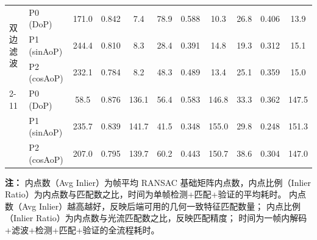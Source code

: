 \begin{table}[t]
\begin{tabular}{llccccccccc}
\multirow{3}{*}{双边滤波}
    & P0 (DoP)     & 171.0 & 0.842 & 7.4  & 78.9  & 0.588 & 10.3 & 26.8  & 0.406 & 13.9 \\
    & P1 (sinAoP)  & 244.4 & 0.810 & 8.3  & 28.4  & 0.391 & 14.8 & 19.3  & 0.312 & 15.1 \\
    & P2 (cosAoP)  & 232.1 & 0.784 & 8.2  & 48.3  & 0.489 & 13.4 & 25.1  & 0.359 & 15.0 \\
\cmidrule{2-11}

\multirow{3}{*}{NLM}
    & P0 (DoP)     & 58.5  & 0.876 & 136.1 & 56.4  & 0.583 & 146.8 & 33.3  & 0.362 & 147.5 \\
    & P1 (sinAoP)  & 235.7 & 0.839 & 141.7 & 41.5  & 0.348 & 155.0 & 29.8  & 0.248 & 151.3 \\
    & P2 (cosAoP)  & 207.0 & 0.795 & 139.7 & 60.2  & 0.443 & 150.7 & 38.6  & 0.304 & 147.0 \\

\midrule
\end{tabular}

\vspace{4pt}
\begin{minipage}{\textwidth}
\footnotesize
\textbf{注：}
内点数（Avg Inlier）为帧平均 RANSAC 基础矩阵内点数，内点比例（Inlier Ratio）为内点数与匹配数之比，时间为单帧检测+匹配+验证的平均耗时。
内点数（Avg Inlier）越高越好，反映后端可用的几何一致特征匹配数量；
内点比例（Inlier Ratio）为内点数与光流匹配数之比，反映匹配精度；
时间为一帧内解码+滤波+检测+匹配+验证的全流程耗时。
\end{minipage}

\end{table}
